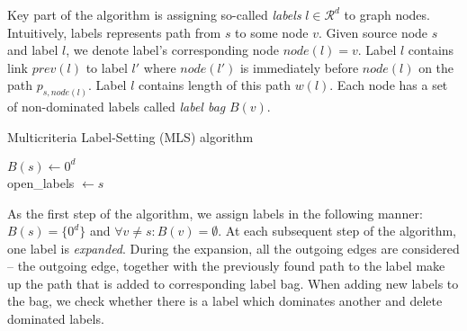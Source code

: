 Key part of the algorithm is assigning so-called \emph{labels} $l\in \mathcal{R}^d$ to graph nodes.
Intuitively, labels represents path from $s$ to some node $v$.
Given source node $s$ and label $l$, we denote label's corresponding node $node(l)=v$.
Label $l$ contains link $prev(l)$ to label $l'$ where $node(l')$ is immediately before $node(l)$ on the path $p_{s,node(l)}$.
Label $l$ contains length of this path $w(l)$.
Each node has a set of non-dominated labels called \emph{label bag} $B(v)$.

\vskip 5mm
\begin{algorithm}[H]
    \SetAlgoLined
    \LinesNumbered
    \caption{Multicriteria Label-Setting (MLS) algorithm}
    \label{MLSalg}
    $B(s) \leftarrow 0^d$ \\
    open\_labels $ \leftarrow s$ \\
    \vskip 5mm
\end{algorithm}
\vskip 5mm

As the first step of the algorithm, we assign labels in the following manner: $B(s)=\{0^d\}$ and $\forall v \ne s: B(v)=\emptyset$.
At each subsequent step of the algorithm, one label is \emph{expanded}. 
During the expansion, all the outgoing edges are considered -- the outgoing edge, together with the previously found path to the label make up the path that is added to corresponding label bag. 
When adding new labels to the bag, we check whether there is a label which dominates another and delete dominated labels.



